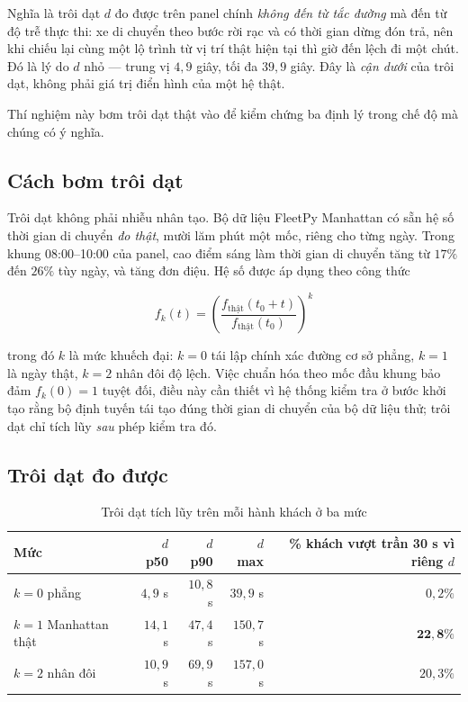 Nghĩa là trôi dạt $d$ đo được trên panel chính \emph{không đến từ tắc đường} mà đến từ độ trễ
thực thi: xe di chuyển theo bước rời rạc và có thời gian dừng đón trả, nên khi chiếu lại cùng
một lộ trình từ vị trí thật hiện tại thì giờ đến lệch đi một chút. Đó là lý do $d$ nhỏ --- trung
vị $4{,}9$ giây, tối đa $39{,}9$ giây. Đây là \emph{cận dưới} của trôi dạt, không phải giá trị
điển hình của một hệ thật.

Thí nghiệm này bơm trôi dạt thật vào để kiểm chứng ba định lý trong chế độ mà chúng có ý nghĩa.

\subsection{Cách bơm trôi dạt}

Trôi dạt không phải nhiễu nhân tạo. Bộ dữ liệu FleetPy Manhattan có sẵn hệ số thời gian di
chuyển \emph{đo thật}, mười lăm phút một mốc, riêng cho từng ngày. Trong khung 08:00--10:00 của
panel, cao điểm sáng làm thời gian di chuyển tăng từ $17\%$ đến $26\%$ tùy ngày, và tăng đơn
điệu. Hệ số được áp dụng theo công thức

\begin{equation}
f_k(t) = \left( \frac{f_{\text{thật}}(t_0 + t)}{f_{\text{thật}}(t_0)} \right)^{k}
\end{equation}

trong đó $k$ là mức khuếch đại: $k=0$ tái lập chính xác đường cơ sở phẳng, $k=1$ là ngày thật,
$k=2$ nhân đôi độ lệch. Việc chuẩn hóa theo mốc đầu khung bảo đảm $f_k(0) = 1$ tuyệt đối, điều
này cần thiết vì hệ thống kiểm tra ở bước khởi tạo rằng bộ định tuyến tái tạo đúng thời gian di
chuyển của bộ dữ liệu thử; trôi dạt chỉ tích lũy \emph{sau} phép kiểm tra đó.

\subsection{Trôi dạt đo được}

\begin{table}[htbp]
\centering
\caption{Trôi dạt tích lũy trên mỗi hành khách ở ba mức}
\label{bang:troidat}
\small
\begin{tabular}{@{}lrrrr@{}}
\toprule
\textbf{Mức} & $d$ \textbf{p50} & $d$ \textbf{p90} & $d$ \textbf{max} & \textbf{\% khách vượt trần 30 s vì riêng $d$}\\
\midrule
$k=0$ phẳng & $4{,}9$ s & $10{,}8$ s & $39{,}9$ s & $0{,}2\%$\\
$k=1$ Manhattan thật & $14{,}1$ s & $47{,}4$ s & $150{,}7$ s & $\mathbf{22{,}8\%}$\\
$k=2$ nhân đôi & $10{,}9$ s & $69{,}9$ s & $157{,}0$ s & $20{,}3\%$\\
\bottomrule
\end{tabular}
\end{table}

